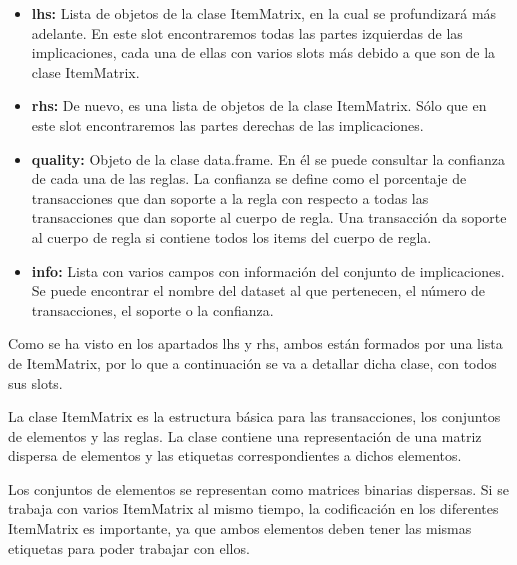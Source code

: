 \begin{itemize}
    \item \textbf{lhs:}
    Lista de objetos de la clase ItemMatrix, en la cual se profundizar\'a m\'as 
    adelante. En este slot encontraremos todas las partes izquierdas de las 
    implicaciones, cada una de ellas con varios slots m\'as debido a que son de la 
    clase ItemMatrix. 

    \item \textbf{rhs:}
    De nuevo, es una lista de objetos de la clase ItemMatrix. S\'olo que en este 
    slot encontraremos las partes derechas de las implicaciones.

    \item \textbf{quality:}
    Objeto de la clase data.frame. En \'el se puede consultar la confianza de cada 
    una de las reglas. La confianza se define como el porcentaje de transacciones 
    que dan soporte a la regla con respecto a todas las transacciones que dan 
    soporte al cuerpo de regla. Una transacci\'on da soporte al cuerpo de regla si 
    contiene todos los items del cuerpo de regla.

    \item \textbf{info:}
    Lista con varios campos con informaci\'on del conjunto de implicaciones. Se puede 
    encontrar el nombre del dataset al que pertenecen, el n\'umero de transacciones, 
    el soporte o la confianza.

\end{itemize}


Como se ha visto en los apartados lhs y rhs, ambos est\'an formados por una lista de 
ItemMatrix, por lo que a continuaci\'on se va a detallar dicha clase, con todos sus slots.

La clase ItemMatrix es la estructura b\'asica para las transacciones, los 
conjuntos de elementos y las reglas.
La clase contiene una representaci\'on de una matriz dispersa de elementos 
y las etiquetas correspondientes a dichos elementos.

Los conjuntos de elementos se representan como matrices binarias dispersas. 
Si se trabaja con varios ItemMatrix al mismo tiempo, la codificaci\'on 
en los diferentes ItemMatrix es importante, ya que ambos elementos deben tener 
las mismas etiquetas para poder trabajar con ellos.

